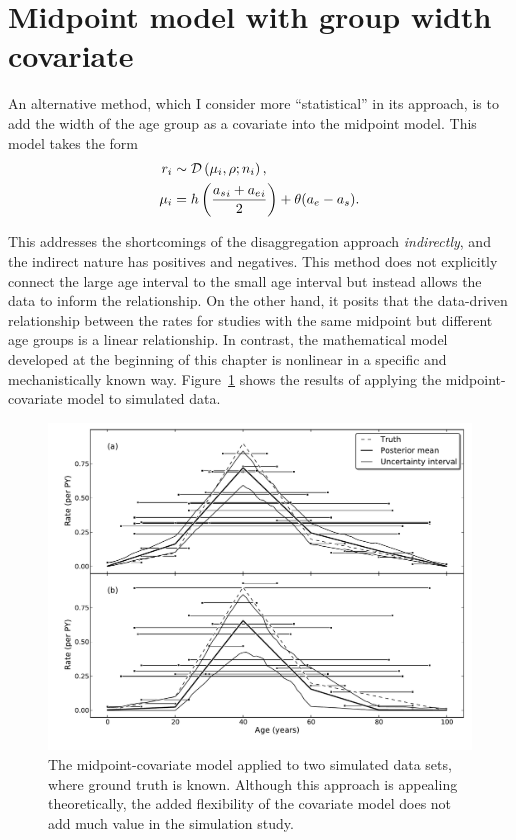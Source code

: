 \section{Midpoint model with group width covariate}
An alternative method, which I consider more ``statistical'' in its
approach, is to add the width of the age group as a covariate into the
midpoint model.  This model takes the form
\begin{align*}
r_i &\sim \mathcal{D}\left(\mu_i, \rho; n_i\right),\\
\mu_i &= h\left(\frac{{a_s}_i+{a_e}_i}{2}\right) + \theta (a_e - a_s).
\end{align*}

This addresses the shortcomings of the disaggregation approach
\emph{indirectly}, and the indirect nature has positives and
negatives.  This method does not explicitly connect the large age
interval to the small age interval but instead allows the data to
inform the relationship.  On the other hand, it posits that the
data-driven relationship between the rates for studies with the same
midpoint but different age groups is a linear relationship. In
contrast, the mathematical model developed at the beginning of this
chapter is nonlinear in
a specific and mechanistically known way.
Figure~\ref{midpoint-covariate} shows the results of applying the midpoint-covariate
model to simulated data.


\begin{figure}[h]
\begin{center}
\includegraphics[width=\textwidth]{age_group_midpoint_covariate.pdf}
\caption{The midpoint-covariate model applied to two simulated
  data sets, where ground truth is known. Although this approach is
  appealing theoretically, the added flexibility of the covariate
  model does not add much value in the simulation study. }
\label{midpoint-covariate}
\end{center}
\end{figure}

